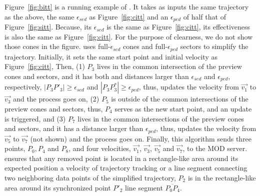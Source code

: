 

\begin{example}
	Figure~\ref{fig:bitt} is a running example of \bitt. It takes as inputs the same trajectory as the above, the same $\epsilon_{sed}$ as Figure~\ref{fig:citt} and an $\epsilon_{ped}$ of half that of Figure~\ref{fig:sitt}. Because, its $\epsilon_{sed}$ is the same as Figure~\ref{fig:citt}, its effectiveness is also the same as Figure~\ref{fig:citt}. For the purpose of clearness, we do not show those cones in the figure.
	\bitt uses full-$\epsilon_{sed}$ cones and full-$\epsilon_{ped}$ sectors to simplify the trajectory. Initially, it sets the same start point and initial velocity as Figure~\ref{fig:citt}, 
	Then, (1) $P_3$ lives in the common intersection of the preview cones and sectors, and it has both \sed and \ped distances larger than $\epsilon_{sed}$ and $\epsilon_{ped}$, respectively, \ie $|P_3P'_3| \ge \epsilon_{sed}$ and $|P_3P^*_3| \ge \epsilon_{ped}$, thus, \bitt updates the velocity from $\vec{v_1}$ to $\vec{v_3}$ and the process goes on, (2) $P_5$ is outside of the common intersections of the preview cones and sectors, thus, $P_4$ serves as the new start point, and an update is triggered, and (3) $P_7$ lives in the common intersections of the preview cones and sectors, and it has a \ped distance larger than $\epsilon_{ped}$, thus, \bitt updates the velocity from $\vec{v_5}$ to $\vec{v_7}$ (not shown) and the process goes on. Finally, this algorithm sends three points, $P_0, P_4$ and $P_8$, and four velocities, $\vec{v_1}$, $\vec{v_3}$, $\vec{v_5}$ and $\vec{v_7}$, to the MOD server. 
	\bitt ensures that any removed point is located in a rectangle-like area around its expected position \wrt a velocity of trajectory tracking or a line segment connecting two neighboring data points of the simplified trajectory, \eg $P_2$ is in the rectangle-like area around its synchronized point $P'_2$ \wrt line segment $\overline{P_0P_4}$. 
\end{example}

